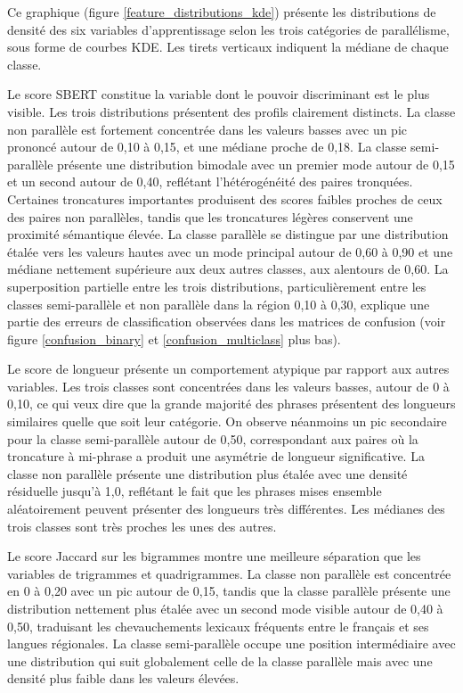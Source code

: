 Ce graphique (figure \ref{feature_distributions_kde}) présente les distributions de densité des six variables
d'apprentissage selon les trois catégories de parallélisme, sous forme de courbes KDE. Les tirets verticaux
indiquent la médiane de chaque classe.

Le score SBERT constitue la variable dont le pouvoir discriminant est le plus visible. Les trois distributions
présentent des profils clairement distincts. La classe non parallèle est fortement concentrée dans les
valeurs basses avec un pic prononcé autour de 0,10 à 0,15, et une médiane proche de 0,18. La classe
semi-parallèle présente une distribution bimodale avec un premier mode autour de 0,15 et un second autour
de 0,40, reflétant l'hétérogénéité des paires tronquées. Certaines troncatures importantes produisent des
scores faibles proches de ceux des paires non parallèles, tandis que les troncatures légères conservent une
proximité sémantique élevée. La classe parallèle se distingue par une distribution étalée vers les valeurs
hautes avec un mode principal autour de 0,60 à 0,90 et une médiane nettement supérieure aux deux autres
classes, aux alentours de 0,60. La superposition partielle entre les trois distributions, particulièrement
entre les classes semi-parallèle et non parallèle dans la région 0,10 à 0,30, explique une partie des
erreurs de classification observées dans les matrices de confusion (voir figure \ref{confusion_binary} et
\ref{confusion_multiclass} plus bas).

Le score de longueur présente un comportement atypique par rapport aux autres variables. Les trois classes
sont concentrées dans les valeurs basses, autour de 0 à 0,10, ce qui veux dire que la grande majorité des
phrases présentent des longueurs similaires quelle que soit leur catégorie. On observe néanmoins un pic
secondaire pour la classe semi-parallèle autour de 0,50, correspondant aux paires où la troncature à
mi-phrase a produit une asymétrie de longueur significative. La classe non parallèle présente une
distribution plus étalée avec une densité résiduelle jusqu'à 1,0, reflétant le fait que les phrases
mises ensemble aléatoirement peuvent présenter des longueurs très différentes. Les médianes des trois classes
sont très proches les unes des autres.

Le score Jaccard sur les bigrammes montre une meilleure séparation que les variables de trigrammes et quadrigrammes. La
classe non parallèle est concentrée en 0 à 0,20 avec un pic autour de 0,15, tandis que la classe parallèle
présente une distribution nettement plus étalée avec un second mode visible autour de 0,40 à 0,50,
traduisant les chevauchements lexicaux fréquents entre le français et ses langues régionales.
La classe semi-parallèle occupe une position intermédiaire avec une distribution qui suit globalement
celle de la classe parallèle mais avec une densité plus faible dans les valeurs élevées.

